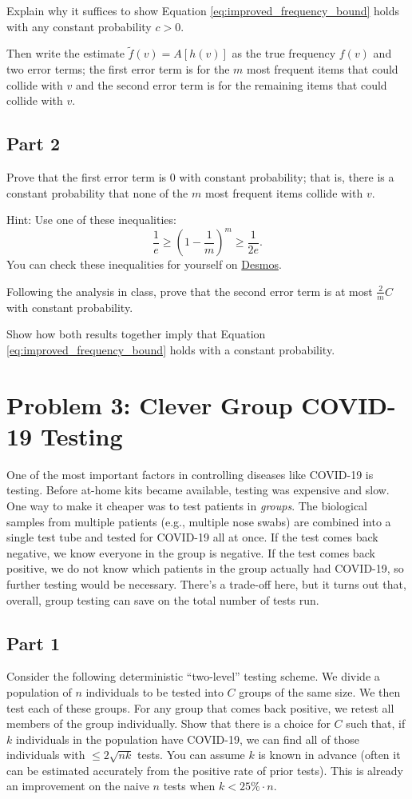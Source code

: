\documentclass{article}
\begin{document}
Explain why it suffices to show Equation \ref{eq:improved_frequency_bound} holds with any constant probability $c > 0$.

Then write the estimate $\tilde{f}(v) = A[h(v)]$ as the true frequency $f(v)$ and two error terms; the first error term is for the $m$ most frequent items that could collide with $v$ and the second error term is for the remaining items that could collide with $v$.

\subsection*{Part 2}
Prove that the first error term is 0 with constant probability; that is, there is a constant probability that none of the $m$ most frequent items collide with $v$.

Hint: Use one of these inequalities: $$\frac1{e} \geq \left(1-\frac1{m}\right)^m \geq \frac{1}{2e}.$$ You can check these inequalities for yourself on \href{https://www.desmos.com/calculator/bok5upfowo}{Desmos}.

Following the analysis in class, prove that the second error term is at most $\frac{2}{m}C$ with constant probability.

Show how both results together imply that Equation \ref{eq:improved_frequency_bound} holds with a constant probability.

%

\section*{Problem 3: Clever Group COVID-19 Testing}

One of the most important factors in controlling diseases like COVID-19 is testing. Before at-home kits became available, testing was expensive and slow. One way to make it cheaper was to test patients in \emph{groups}. The biological samples from multiple patients (e.g., multiple nose swabs) are combined into a single test tube and tested for COVID-19 all at once. If the test comes back negative, we know everyone in the group is negative. If the test comes back positive, we do not know which patients in the group actually had COVID-19, so further testing would be necessary. There's a trade-off here, but it turns out that, overall, group testing can save on the total number of tests run. 

\subsection*{Part 1}
Consider the following deterministic ``two-level'' testing scheme. We divide a population of $n$ individuals to be tested into $C$ groups of the same size. We then test each of these groups. For any group that comes back positive, we retest all members of the group individually. Show that there is a choice for $C$ such that, if $k$ individuals in the population have COVID-19, we can find all of those individuals with $\leq 2\sqrt{nk}$ tests. You can assume $k$ is known in advance (often it can be estimated accurately from the positive rate of prior tests). This is already an improvement on the naive $n$ tests when $k < 25\% \cdot n$.
	
\end{document}

